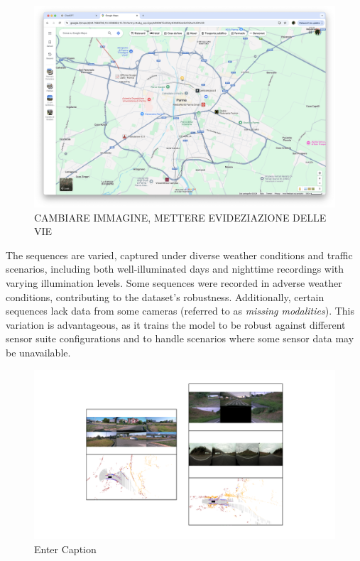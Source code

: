 \begin{figure}[H]
    \centering
    \includegraphics[width=1\linewidth]{LateX//figs/vie_citta.png}
    \caption{CAMBIARE IMMAGINE, METTERE EVIDEZIAZIONE DELLE VIE}
    \label{fig:enter-label}
\end{figure}
The sequences are varied, captured under diverse weather conditions and traffic scenarios, including both well-illuminated days and nighttime recordings with varying illumination levels. Some sequences were recorded in adverse weather conditions, contributing to the dataset's robustness. Additionally, certain sequences lack data from some cameras (referred to as \textit{missing modalities}). This variation is advantageous, as it trains the model to be robust against different sensor suite configurations and to handle scenarios where some sensor data may be unavailable.
\begin{figure}
    \centering
    \includegraphics[width=0.9\linewidth]{LateX//figs/missing_modalities.pdf}
    \caption{Enter Caption}
    \label{fig:enter-label}
\end{figure}
